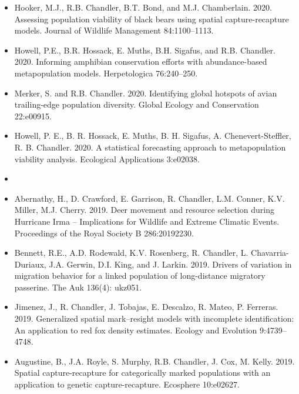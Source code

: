 \begin{itemize}
\item Hooker, M.J., R.B. Chandler, B.T. Bond, and
  M.J. Chamberlain. 2020. Assessing population viability of black
  bears using spatial capture-recapture models. Journal of Wildlife
  Management 84:1100--1113.  
  
\item Howell, P.E., B.R. Hossack, E. Muths, B.H. Sigafus, and
  R.B. Chandler. 2020. Informing amphibian conservation efforts
  with abundance-based metapopulation models. Herpetologica 76:240--250. 

\item Merker, S. and R.B. Chandler. 2020. Identifying global hotspots
  of avian trailing-edge population diversity. Global Ecology and
  Conservation 22:e00915.   

\item Howell, P. E., B. R. Hossack, E. Muths, B. H. Sigafus,
  A. Chenevert-Steffler, R. B. Chandler. 2020. A statistical 
  forecasting approach to metapopulation viability
  analysis. Ecological Applications 3:e02038. 

  
\item[] { \\}

\item Abernathy, H., D. Crawford, E. Garrison, R. Chandler,
  L.M. Conner, K.V. Miller, M.J. Cherry. 2019. Deer movement and
  resource selection during Hurricane Irma -- Implications for
  Wildlife and Extreme Climatic Events. Proceedings of the Royal
  Society B 286:20192230. 
  
\item Bennett, R.E., A.D. Rodewald, K.V. Rosenberg, R. Chandler,
  L. Chavarria-Duriaux, J.A. Gerwin, D.I. King, and
  J. Larkin. 2019. Drivers of variation in migration behavior for a
  linked population of long-distance migratory passerine. The Auk
  136(4): ukz051.
  
\item Jimenez, J., R. Chandler, J. Tobajas, E. Descalzo, R. Mateo,
  P. Ferreras. 2019. Generalized spatial mark–resight models with
  incomplete identification: An application to red fox density
  estimates. Ecology and Evolution 9:4739--4748. 
  
\item Augustine, B., J.A. Royle, S. Murphy, R.B. Chandler,
  J. Cox, M. Kelly. 2019. Spatial capture-recapture for
  categorically marked populations with an application to genetic
  capture-recapture. Ecosphere 10:e02627.


\end{itemize}
